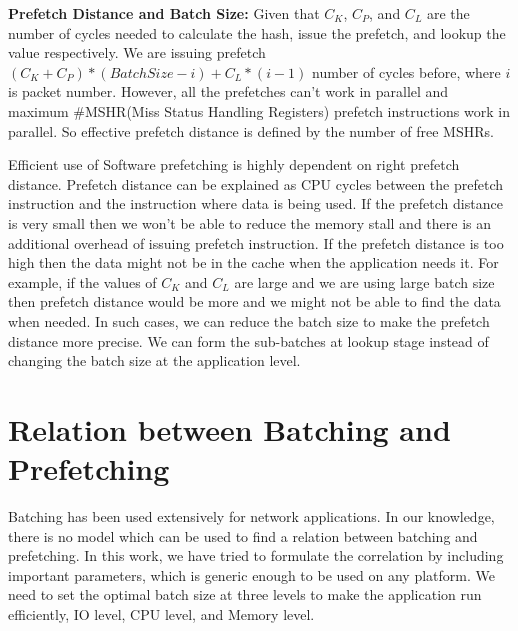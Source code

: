 \textbf{Prefetch Distance and Batch Size:}
\label{subbatching}
Given that $C_K$, $C_P$, and $C_L$ are the number of cycles needed to calculate the hash, issue the prefetch, and lookup the value respectively. We are issuing prefetch $(C_K + C_P) * (BatchSize-i) + C_L*(i-1)$ number of cycles before, where $i$ is packet number. However, all the prefetches can't work in parallel and maximum \#MSHR(Miss Status Handling Registers) prefetch instructions work in parallel. So effective prefetch distance is defined by the number of free MSHRs.

Efficient use of Software prefetching is highly dependent on right prefetch distance. Prefetch distance can be explained as CPU cycles between the prefetch instruction and the instruction where data is being used. If the prefetch distance is very small then we won't be able to reduce the memory stall and there is an additional overhead of issuing prefetch instruction. If the prefetch distance is too high then the data might not be in the cache when the application needs it. For example, if the values of $C_K$ and $C_L$ are large and we are using large batch size then prefetch distance would be more and we might not be able to find the data when needed. In such cases, we can reduce the batch size to make the prefetch distance more precise. We can form the sub-batches at lookup stage instead of changing the batch size at the application level.

\section{Relation between Batching and Prefetching}
\label{optimalbatchsize}
Batching has been used extensively for network applications. In our knowledge, there is no model which can be used to find a relation between batching and prefetching. In this work, we have tried to formulate the correlation by including important parameters, which is generic enough to be used on any platform. We need to set the optimal batch size at three levels to make the application run efficiently, IO level, CPU level, and Memory level.

